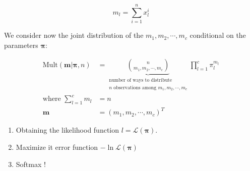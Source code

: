 \begin{equation}
  m_l = \sum_{i=1}^n x_l^i \tag{number of observations of class $l$ in data}
\end{equation}

We consider now the joint distribution of the $m_1, m_2, \cdots, m_c$ conditional on the
parameters $\boldsymbol\pi$:

\begin{align*}
  \text{Mult}(\boldsymbol{m} | \boldsymbol\pi, n) &=
\underbrace{\binom{n}{m_1, m_2, \cdots, m_c}}_{\substack{\text{number of ways to distribute} \\ \text{$n$ observations among $m_1, m_2, \cdots, m_c$}}}
        \prod_{l=1}^c \pi_l^{m_l} \\
    \text{where } \sum_{l=1}^c m_l &= n \\
    \boldsymbol{m} &= (m_1, m_2, \cdots, m_c)^T
\end{align*}


\begin{enumerate}
  \item Obtaining the likelihood function $l = \mathcal{L}(\boldsymbol\pi)$.
  \item Maximize it \textrightarrow{} error function $- \ln \mathcal{L}(\boldsymbol\pi)$
  \item Softmax !
\end{enumerate}

